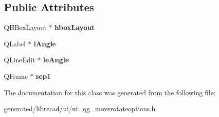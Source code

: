 \subsection*{Public Attributes}
\begin{DoxyCompactItemize}
\item 
\hypertarget{classUi__QG__MoveRotateOptions_a33302ee2adcba70953e4d2447e555a91}{Q\-H\-Box\-Layout $\ast$ {\bfseries hbox\-Layout}}\label{classUi__QG__MoveRotateOptions_a33302ee2adcba70953e4d2447e555a91}

\item 
\hypertarget{classUi__QG__MoveRotateOptions_adcb122c25fa3413291bee0422c315333}{Q\-Label $\ast$ {\bfseries l\-Angle}}\label{classUi__QG__MoveRotateOptions_adcb122c25fa3413291bee0422c315333}

\item 
\hypertarget{classUi__QG__MoveRotateOptions_ac23c9521472955283174c22aaf8f82e0}{Q\-Line\-Edit $\ast$ {\bfseries le\-Angle}}\label{classUi__QG__MoveRotateOptions_ac23c9521472955283174c22aaf8f82e0}

\item 
\hypertarget{classUi__QG__MoveRotateOptions_ac69b481eb4f1a99c86a5fadb45ba085c}{Q\-Frame $\ast$ {\bfseries sep1}}\label{classUi__QG__MoveRotateOptions_ac69b481eb4f1a99c86a5fadb45ba085c}

\end{DoxyCompactItemize}


The documentation for this class was generated from the following file\-:\begin{DoxyCompactItemize}
\item 
generated/librecad/ui/ui\-\_\-qg\-\_\-moverotateoptions.\-h\end{DoxyCompactItemize}
